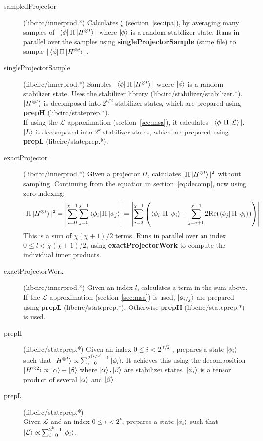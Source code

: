 \documentclass[11pt]{article}
\begin{document}
\begin{description}
    \item[sampledProjector] (libcirc/innerprod.*) Calculates $\xi$ (section~\ref{sec:ipa}), by averaging many samples of $|\bra{\phi}\Pi\ket{H^{\otimes t}}|$ where $\ket{\phi}$ is a random stabilizer state. Runs in parallel over the samples using \textbf{singleProjectorSample} (same file) to sample $|\bra{\phi}\Pi\ket{H^{\otimes t}}|$.
    \item[singleProjectorSample] (libcirc/innerprod.*) Samples $|\bra{\phi}\Pi\ket{H^{\otimes t}}|$ where $\ket{\phi}$ is a random stabilizer state. Uses the stabilizer library (libcirc/stabilizer/stabilizer.*). $\ket{H^{\otimes t}}$ is decomposed into $2^{t/2}$ stabilizer states, which are prepared using \textbf{prepH} (libcirc/stateprep.*).\\ If using the $\mathcal{L}$ approximation (section~\ref{sec:msa}), it calculates $|\bra{\phi}\Pi\ket{\mathcal{L}}|$. $\ket{L}$ is decomposed into $2^k$ stabilizer states, which are prepared using \textbf{prepL} (libcirc/stateprep.*).



    \item[exactProjector] (libcirc/innerprod.*) Given a projector $\Pi$, calculates $|\Pi\ket{H^{\otimes t}}|^2$ without sampling. Continuing from the equation in section~\ref{eq:decomp}, now using zero-indexing:
        $$ |\Pi\ket{H^{\otimes t}}|^2 = \left| \sum^{\chi-1}_{i=0} \sum^{\chi-1}_{j=0}\bra{\phi_i}\Pi\ket{\phi_j}\right| = \left| \sum^{\chi-1}_{i=0}\left( \bra{\phi_i}\Pi\ket{\phi_i} + \sum^{\chi-1}_{j=i+1}2\text{Re}( \bra{\phi_j}\Pi\ket{\phi_i})\right)\right| $$
        This is a sum of $\chi(\chi+1)/2$ terms. Runs in parallel over an index $0 \leq l < \chi(\chi+1)/2$, using \textbf{exactProjectorWork} to compute the individual inner products.

    \item[exactProjectorWork] (libcirc/innerprod.*) Given an index $l$, calculates a term in the sum above. If the $\mathcal{L}$ approximation (section~\ref{sec:msa}) is used, $\ket{\phi_{i/j}}$ are prepared using \textbf{prepL} (libcirc/stateprep.*). Otherwise \textbf{prepH} (libcirc/stateprep.*) is used.

    \item[prepH] (libcirc/stateprep.*) Given an index $0 \leq i < 2^{\lceil t/2\rceil}$, prepares a state $\ket{\phi_i}$ such that $\ket{H^{\otimes t}} \propto \sum_{i=0}^{2^{\lceil t/2 \rceil}-1} \ket{\phi_i} $. It achieves this using the decomposition $\ket{H^{\otimes 2}} \propto \ket{\alpha} + \ket{\beta}$ where $\ket{\alpha},\ket{\beta}$ are stabilizer states. $\ket{\phi_i}$ is a tensor product of several $\ket{\alpha}$ and $\ket{\beta}$. 
    
    \item[prepL] (libcirc/stateprep.*) \\Given $\mathcal{L}$ and an index $0 \leq i < 2^{ k}$, prepares a state $\ket{\phi_i}$ such that $\ket{\mathcal{L}} \propto \sum_{i=0}^{2^{k}-1} \ket{\phi_i} $. 
  

\end{description}
\end{document}

